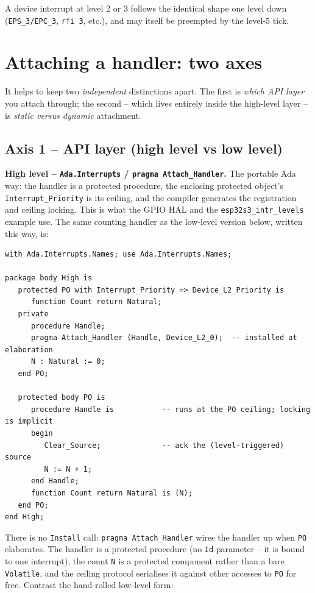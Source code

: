 A device interrupt at level 2 or 3 follows the identical shape one level down
(\texttt{EPS\_3/EPC\_3}, \texttt{rfi 3}, etc.), and may itself be preempted by the
level-5 tick.

\section{Attaching a handler: two axes}

It helps to keep two \emph{independent} distinctions apart. The first is
\emph{which API layer} you attach through; the second -- which lives entirely
inside the high-level layer -- is \emph{static versus dynamic} attachment.

\subsection{Axis 1 -- API layer (high level vs low level)}

\textbf{High level -- \texttt{Ada.Interrupts} / \texttt{pragma Attach\_Handler}.}
The portable Ada way: the handler is a protected procedure, the enclosing
protected object's \texttt{Interrupt\_Priority} is its ceiling, and the compiler
generates the registration and ceiling locking. This is what the GPIO HAL and the
\texttt{esp32s3\_intr\_levels} example use. The same counting handler as the
low-level version below, written this way, is:

\begin{lstlisting}
with Ada.Interrupts.Names; use Ada.Interrupts.Names;

package body High is
   protected PO with Interrupt_Priority => Device_L2_Priority is
      function Count return Natural;
   private
      procedure Handle;
      pragma Attach_Handler (Handle, Device_L2_0);  -- installed at elaboration
      N : Natural := 0;
   end PO;

   protected body PO is
      procedure Handle is           -- runs at the PO ceiling; locking is implicit
      begin
         Clear_Source;              -- ack the (level-triggered) source
         N := N + 1;
      end Handle;
      function Count return Natural is (N);
   end PO;
end High;
\end{lstlisting}

There is no \texttt{Install} call: \texttt{pragma Attach\_Handler} wires the
handler up when \texttt{PO} elaborates. The handler is a protected procedure (no
\texttt{Id} parameter -- it is bound to one interrupt), the count \texttt{N} is a
protected component rather than a bare \texttt{Volatile}, and the ceiling protocol
serialises it against other accesses to \texttt{PO} for free. Contrast the
hand-rolled low-level form:

